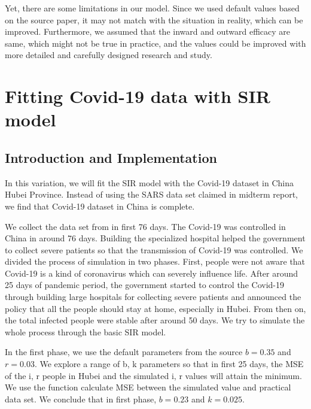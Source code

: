 \documentclass{article}
\begin{document}
Yet, there are some limitations in our model. Since we used default values based on the source paper\cite{Steff2020mask}, it may not match with the situation in reality, which can be improved. Furthermore, we assumed that the inward and outward efficacy are same, which might not be true in practice, and the values could be improved with more detailed and carefully designed research and study.






\section{Fitting Covid-19 data with SIR model}

\subsection{Introduction and Implementation}

In this variation, we will fit the SIR model with the Covid-19 dataset in China Hubei Province. Instead of using the SARS data set claimed in midterm report, we find that Covid-19 dataset in China is complete.

We collect the data set from \cite{Johnhopkins} in first 76 days. The Covid-19 was controlled in China in around 76 days. Building the specialized hospital helped the government to collect severe patients so that the transmission of Covid-19 was controlled. We divided the process of simulation in two phases. First, people were not aware that Covid-19 is a kind of coronavirus which can severely influence life. After around 25 days of pandemic period, the government started to control the Covid-19 through building large hospitals for collecting severe patients and announced the policy that all the people should stay at home, especially in Hubei. From then on, the total infected people were stable after around 50 days. We try to simulate the whole process through the basic SIR model.

In the first phase, we use the default parameters from the source \cite{Cooper2020SIR} $b = 0.35$ and $r = 0.03$. We explore a range of b, k parameters so that in first 25 days, the MSE of the i, r people in Hubei and the simulated i, r values will attain the minimum. We use the function calculate MSE between the simulated value and practical data set. We conclude that in first phase, $b = 0.23$ and $k = 0.025$.
\end{document}
